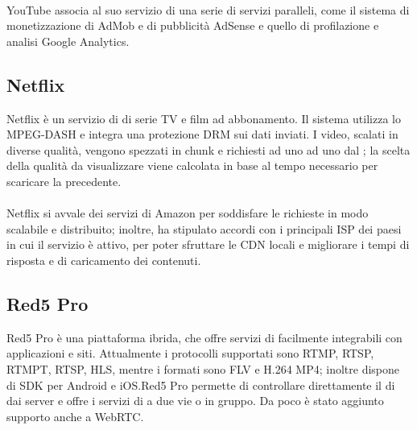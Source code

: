 		\paragraph*{}
		YouTube associa al suo servizio di  una serie di servizi paralleli, come il sistema di monetizzazione di AdMob e di pubblicità AdSense e quello di profilazione e analisi Google Analytics.
	
		\subsection{Netflix}
		Netflix è un servizio di   di serie TV e film ad abbonamento. Il sistema utilizza lo  \gls{MPEG-DASH} e integra una protezione \gls{DRM} sui dati inviati. I video, scalati in diverse qualità, vengono spezzati in chunk e richiesti ad uno ad uno dal ; la scelta della qualità da visualizzare viene calcolata in base al tempo necessario per scaricare la precedente.
		\paragraph*{}
		Netflix si avvale dei servizi  di Amazon per soddisfare le richieste in modo scalabile e distribuito; inoltre, ha stipulato accordi con i principali \gls{ISP} dei paesi in cui il servizio è attivo, per poter sfruttare le \gls{CDN} locali e migliorare i tempi di risposta e di caricamento dei contenuti.
	
		\subsection{Red5 Pro}
		Red5 Pro è una piattaforma ibrida, che offre servizi di  facilmente integrabili con applicazioni e siti. Attualmente i protocolli supportati sono \gls{RTMP}, \gls{RTSP}, \gls{RTMPT}, \gls{RTSP}, \gls{HLS}, mentre i formati sono FLV e H.264 MP4; inoltre dispone di \gls{SDK} per Android e iOS.\@ Red5 Pro permette di controllare direttamente il  di  dai server e offre i servizi di  a due vie o in gruppo. Da poco è stato aggiunto supporto anche a WebRTC.\@
	
